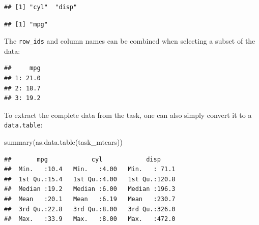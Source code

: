 \documentclass[
]{scrbook}
\newenvironment{Shaded}{\begin{snugshade}}{\end{snugshade}}
\newcommand{\AttributeTok}[1]{\textcolor[rgb]{0.77,0.63,0.00}{#1}}
\newcommand{\CommentTok}[1]{\textcolor[rgb]{0.56,0.35,0.01}{\textit{#1}}}
\newcommand{\DecValTok}[1]{\textcolor[rgb]{0.00,0.00,0.81}{#1}}
\newcommand{\FunctionTok}[1]{\textcolor[rgb]{0.00,0.00,0.00}{#1}}
\newcommand{\NormalTok}[1]{#1}
\newcommand{\SpecialCharTok}[1]{\textcolor[rgb]{0.00,0.00,0.00}{#1}}
\newcommand{\StringTok}[1]{\textcolor[rgb]{0.31,0.60,0.02}{#1}}
\renewenvironment{Shaded} {\begin{snugshade}\small} {\end{snugshade}}
\begin{document}
\begin{verbatim}
## [1] "cyl"  "disp"
\end{verbatim}

\begin{Shaded}
\end{Shaded}

\begin{verbatim}
## [1] "mpg"
\end{verbatim}

The \texttt{row\_ids} and column names can be combined when selecting a subset of the data:

\begin{Shaded}
\end{Shaded}

\begin{verbatim}
##     mpg
## 1: 21.0
## 2: 18.7
## 3: 19.2
\end{verbatim}

To extract the complete data from the task, one can also simply convert it to a \texttt{data.table}:

\begin{Shaded}
\begin{Highlighting}[]
\FunctionTok{summary}\NormalTok{(}\FunctionTok{as.data.table}\NormalTok{(task\_mtcars))}
\end{Highlighting}
\end{Shaded}

\begin{verbatim}
##       mpg            cyl            disp      
##  Min.   :10.4   Min.   :4.00   Min.   : 71.1  
##  1st Qu.:15.4   1st Qu.:4.00   1st Qu.:120.8  
##  Median :19.2   Median :6.00   Median :196.3  
##  Mean   :20.1   Mean   :6.19   Mean   :230.7  
##  3rd Qu.:22.8   3rd Qu.:8.00   3rd Qu.:326.0  
##  Max.   :33.9   Max.   :8.00   Max.   :472.0
\end{verbatim}
\end{document}
